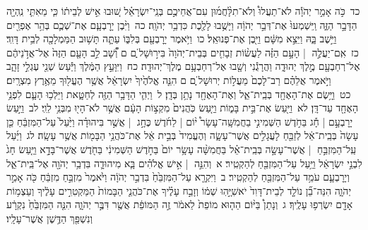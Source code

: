 \documentclass[18pt]{article}
\newcommand{\kri}[1]{\Afootnote{#1}}	%
\begin{document}
 {\loc כד~}כֹּ֣ה אָמַ֣ר יְהֹוָ֡ה לֹא־תַעֲלוּ֩ וְלֹא־תִלָּ֨חֲמ֜וּן עִם־אֲחֵיכֶ֣ם בְּנֵֽי־יִשְׂרָאֵ֗ל שׁ֚וּבוּ אִ֣ישׁ לְבֵית֔וֹ כִּ֧י מֵאִתִּ֛י נִֽהְיָ֖ה הַדָּבָ֣ר הַזֶּ֑ה וַֽיִּשְׁמְעוּ֙ אֶת־דְּבַ֣ר יְהֹוָ֔ה וַיָּשֻׁ֥בוּ לָלֶ֖כֶת כִּדְבַ֥ר יְהֹוָֽה׃ \startlock
 {\loc כה~}וַיִּ֨בֶן יָרׇבְעָ֧ם אֶת־שְׁכֶ֛ם בְּהַ֥ר אֶפְרַ֖יִם וַיֵּ֣שֶׁב בָּ֑הּ וַיֵּצֵ֣א מִשָּׁ֔ם וַיִּ֖בֶן אֶת־פְּנוּאֵֽל׃ \startlock
 {\loc כו~}וַיֹּ֥אמֶר יָרׇבְעָ֖ם בְּלִבּ֑וֹ עַתָּ֛ה תָּשׁ֥וּב הַמַּמְלָכָ֖ה לְבֵ֥ית דָּוִֽד׃ \startlock
 {\loc כז~}אִֽם־יַעֲלֶ֣ה  |  הָעָ֣ם הַזֶּ֗ה לַעֲשׂ֨וֹת זְבָחִ֤ים בְּבֵית־יְהֹוָה֙ בִּיר֣וּשָׁל ַ֔͏ְם ם וְ֠שָׁ֠ב לֵ֣ב הָעָ֤ם הַזֶּה֙ אֶל־אֲדֹ֣נֵיהֶ֔ם אֶל־רְחַבְעָ֖ם מֶ֣לֶךְ יְהוּדָ֑ה וַהֲרָגֻ֕נִי וְשָׁ֖בוּ אֶל־רְחַבְעָ֥ם מֶלֶךְ־יְהוּדָֽה׃ \startlock
 {\loc כח~}וַיִּוָּעַ֣ץ הַמֶּ֔לֶךְ וַיַּ֕עַשׂ שְׁנֵ֖י עֶגְלֵ֣י זָהָ֑ב וַיֹּ֣אמֶר אֲלֵהֶ֗ם רַב־לָכֶם֙ מֵעֲל֣וֹת יְרוּשָׁל ַ֔͏ְם ם הִנֵּ֤ה אֱלֹהֶ֙יךָ֙ יִשְׂרָאֵ֔ל אֲשֶׁ֥ר הֶעֱל֖וּךָ מֵאֶ֥רֶץ מִצְרָֽיִם׃ \startlock
 {\loc כט~}וַיָּ֥שֶׂם אֶת־הָאֶחָ֖ד בְּבֵֽית־אֵ֑ל וְאֶת־הָאֶחָ֖ד נָתַ֥ן בְּדָֽן׃ \startlock
 {\loc ל~}וַיְהִ֛י הַדָּבָ֥ר הַזֶּ֖ה לְחַטָּ֑את וַיֵּלְכ֥וּ הָעָ֛ם לִפְנֵ֥י הָאֶחָ֖ד עַד־דָּֽן׃ \startlock
 {\loc לא~}וַיַּ֖עַשׂ אֶת־בֵּ֣ית בָּמ֑וֹת וַיַּ֤עַשׂ כֹּֽהֲנִים֙ מִקְצ֣וֹת הָעָ֔ם אֲשֶׁ֥ר לֹא־הָי֖וּ מִבְּנֵ֥י לֵוִֽי׃ \startlock
 {\loc לב~}וַיַּ֣עַשׂ יָרׇבְעָ֣ם  |  חָ֡ג בַּחֹ֣דֶשׁ הַשְּׁמִינִ֣י בַחֲמִשָּֽׁה־עָשָׂר֩ י֨וֹם  |  לַחֹ֜דֶשׁ כֶּחָ֣ג  |  אֲשֶׁ֣ר בִּיהוּדָ֗ה וַיַּ֙עַל֙ עַל־הַמִּזְבֵּ֔חַ כֵּ֤ן עָשָׂה֙ בְּבֵֽית־אֵ֔ל לְזַבֵּ֖חַ לָעֲגָלִ֣ים אֲשֶׁר־עָשָׂ֑ה וְהֶעֱמִיד֙ בְּבֵ֣ית אֵ֔ל אֶת־כֹּהֲנֵ֥י הַבָּמ֖וֹת אֲשֶׁ֥ר עָשָֽׂה׃ \startlock
 {\loc לג~}וַיַּ֜עַל עַֽל־הַמִּזְבֵּ֣חַ  |  אֲשֶׁר־עָשָׂ֣ה בְּבֵֽית־אֵ֗ל בַּחֲמִשָּׁ֨ה עָשָׂ֥ר יוֹם֙ בַּחֹ֣דֶשׁ הַשְּׁמִינִ֔י בַּחֹ֖דֶשׁ אֲשֶׁר־בָּדָ֣א  \edtext{(מלבד)}{\kri{קרי: מִלִּבּ֑וֹ}}  וַיַּ֤עַשׂ חָג֙ לִבְנֵ֣י יִשְׂרָאֵ֔ל וַיַּ֥עַל עַל־הַמִּזְבֵּ֖חַ לְהַקְטִֽיר׃ 
\startlock
 {\loc א~}וְהִנֵּ֣ה  |  אִ֣ישׁ אֱלֹהִ֗ים בָּ֧א מִיהוּדָ֛ה בִּדְבַ֥ר יְהֹוָ֖ה אֶל־בֵּֽית־אֵ֑ל וְיָרׇבְעָ֛ם עֹמֵ֥ד עַל־הַמִּזְבֵּ֖חַ לְהַקְטִֽיר׃ \startlock
 {\loc ב~}וַיִּקְרָ֤א עַל־הַמִּזְבֵּ֙חַ֙ בִּדְבַ֣ר יְהֹוָ֔ה וַיֹּ֙אמֶר֙ מִזְבֵּ֣חַ מִזְבֵּ֔חַ כֹּ֖ה אָמַ֣ר יְהֹוָ֑ה הִנֵּה־בֵ֞ן נוֹלָ֤ד לְבֵית־דָּוִד֙ יֹאשִׁיָּ֣הֽוּ שְׁמ֔וֹ וְזָבַ֣ח עָלֶ֗יךָ אֶת־כֹּהֲנֵ֤י הַבָּמוֹת֙ הַמַּקְטִרִ֣ים עָלֶ֔יךָ וְעַצְמ֥וֹת אָדָ֖ם יִשְׂרְפ֥וּ עָלֶֽיךָ׃ \startlock
 {\loc ג~}וְנָתַן֩ בַּיּ֨וֹם הַה֤וּא מוֹפֵת֙ לֵאמֹ֔ר זֶ֣ה הַמּוֹפֵ֔ת אֲשֶׁ֖ר דִּבֶּ֣ר יְהֹוָ֑ה הִנֵּ֤ה הַמִּזְבֵּ֙חַ֙ נִקְרָ֔ע וְנִשְׁפַּ֖ךְ הַדֶּ֥שֶׁן אֲשֶׁר־עָלָֽיו׃ \startlock
\end{document}
